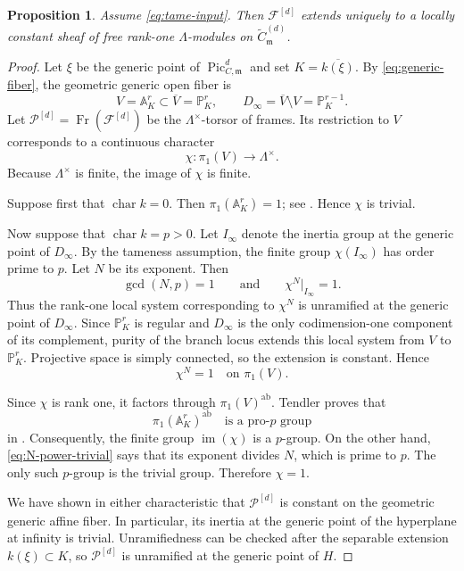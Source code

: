 \documentclass[11pt]{article}
\newtheorem{proposition}{Proposition}
\newcommand{\A}{\mathbb A}
\newcommand{\Pj}{\mathbb P}
\newcommand{\F}{\mathcal F}
\newcommand{\cP}{\mathcal P}
\newcommand{\m}{\mathfrak m}
\newcommand{\Pic}{\operatorname{Pic}}
\newcommand{\Fr}{\operatorname{Fr}}
\begin{document}
\begin{proposition}\label{prop:extension}
Assume \eqref{eq:tame-input}.  Then $\F^{[d]}$ extends uniquely to a
locally constant sheaf of free rank-one $\Lambda$-modules on
$\widetilde C^{(d)}_{\m}$.
\end{proposition}

\begin{proof}
Let $\xi$ be the generic point of $\Pic_{C,\m}^{d}$ and set
$K=\overline{k(\xi)}$.  By \eqref{eq:generic-fiber}, the geometric generic
open fiber is
\[
 V=\A^r_K\subset \overline V=\Pj^r_K,
 \qquad
 D_\infty=\overline V\setminus V=\Pj^{r-1}_K.
\]
Let $\cP^{[d]}=\Fr(\F^{[d]})$ be the $\Lambda^\times$-torsor of frames.
Its restriction to $V$ corresponds to a continuous character
\[
 \chi\colon \pi_1(V)\longrightarrow \Lambda^\times.
\]
Because $\Lambda^\times$ is finite, the image of $\chi$ is finite.

Suppose first that $\operatorname{char}k=0$.  Then $\pi_1(\A^r_K)=1$;
see \cite[Example~4.14]{Tendler}.  Hence $\chi$ is trivial.

Now suppose that $\operatorname{char}k=p>0$.  Let $I_\infty$ denote the
inertia group at the generic point of $D_\infty$.  By the tameness assumption,
the finite group $\chi(I_\infty)$ has order prime to $p$.  Let $N$ be its
exponent.  Then
\[
 \gcd(N,p)=1
 \qquad\text{and}\qquad
 \chi^N|_{I_\infty}=1.
\]
Thus the rank-one local system corresponding to $\chi^N$ is unramified at
the generic point of $D_\infty$.  Since $\Pj^r_K$ is regular and
$D_\infty$ is the only codimension-one component of its complement, purity
of the branch locus extends this local system from $V$ to $\Pj^r_K$.
Projective space is simply connected, so the extension is constant.  Hence
\begin{equation}\label{eq:N-power-trivial}
 \chi^N=1\quad\text{on }\pi_1(V).
\end{equation}

Since $\chi$ is rank one, it factors through $\pi_1(V)^{\mathrm{ab}}$.
Tendler proves that
\[
 \pi_1(\A^r_K)^{\mathrm{ab}}
 \quad\text{is a pro-}p\text{ group}
\]
in \cite[Example~4.15]{Tendler}.  Consequently, the finite group
$\operatorname{im}(\chi)$ is a $p$-group.  On the other hand,
\eqref{eq:N-power-trivial} says that its exponent divides $N$, which is
prime to $p$.  The only such $p$-group is the trivial group.  Therefore
$\chi=1$.

We have shown in either characteristic that $\cP^{[d]}$ is constant on the
geometric generic affine fiber.  In particular, its inertia at the generic
point of the hyperplane at infinity is trivial.  Unramifiedness can be
checked after the separable extension $k(\xi)\subset K$, so
$\cP^{[d]}$ is unramified at the generic point of $H$.


\end{proof}
\end{document}
